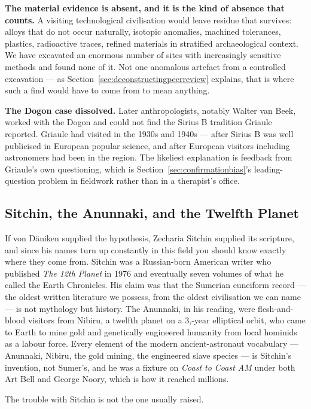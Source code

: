 \textbf{The material evidence is absent, and it is the kind of absence that counts.} A visiting
technological civilisation would leave residue that survives: alloys that do not occur
naturally, isotopic anomalies, machined tolerances, plastics, radioactive traces, refined
materials in stratified archaeological context. We have excavated an enormous number of sites
with increasingly sensitive methods and found none of it. Not one anomalous artefact from a
controlled excavation --- as Section~\ref{sec:deconstructingpeerreview} explains, that is where such a find would have to come
from to mean anything.

\textbf{The Dogon case dissolved.} Later anthropologists, notably Walter van Beek, worked with
the Dogon and could not find the Sirius B tradition Griaule reported. Griaule had visited in
the 1930s and 1940s --- after Sirius B was well publicised in European popular science, and
after European visitors including astronomers had been in the region. The likeliest explanation
is feedback from Griaule's own questioning, which is Section~\ref{sec:confirmationbias}'s leading-question problem in
fieldwork rather than in a therapist's office.

\subsection{Sitchin, the Anunnaki, and the Twelfth Planet}

If von D\"aniken supplied the hypothesis, Zecharia Sitchin supplied its scripture, and since his
names turn up constantly in this field you should know exactly where they come from. Sitchin was a
Russian-born American writer who published \emph{The 12th Planet} in 1976 and eventually seven
volumes of what he called the Earth Chronicles. His claim was that the Sumerian cuneiform record
--- the oldest written literature we possess, from the oldest civilisation we can name --- is not
mythology but history. The Anunnaki, in his reading, were flesh-and-blood visitors from Nibiru, a
twelfth planet on a 3,-year elliptical orbit, who came to Earth to mine gold and
genetically engineered humanity from local hominids as a labour force. Every element of the modern
ancient-astronaut vocabulary --- Anunnaki, Nibiru, the gold mining, the engineered slave species
--- is Sitchin's invention, not Sumer's, and he was a fixture on \emph{Coast to Coast AM} under
both Art Bell and George Noory, which is how it reached millions.

The trouble with Sitchin is not the one usually raised.

